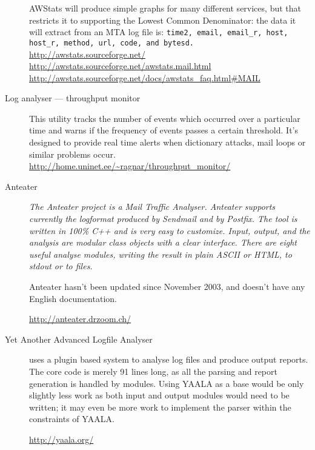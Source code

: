 \documentclass[a4paper,12pt,draft]{article}
\begin{document}
\begin{description}
        AWStats will produce simple graphs for many different services, but
        that restricts it to supporting the Lowest Common Denominator: the
        data it will extract from an MTA log file is:
        \texttt{time2, email, email\_r, host, host\_r, method, url, code,
        and bytesd.} \newline
        \url{http://awstats.sourceforge.net/} \newline
        \url{http://awstats.sourceforge.net/awstats.mail.html} \newline
        \url{http://awstats.sourceforge.net/docs/awstats_faq.html#MAIL}

    \item [Log analyser --- throughput monitor] This utility tracks the
        number of events which occurred over a particular time and warns if
        the frequency of events passes a certain threshold.  It's designed
        to provide real time alerts when dictionary attacks, mail loops or
        similar problems occur.  \newline
        \url{http://home.uninet.ee/~ragnar/throughput_monitor/}

    \item [Anteater] \textit{The Anteater project is a Mail Traffic
        Analyser. Anteater supports currently the logformat produced by
        Sendmail and by Postfix. The tool is written in 100\% C++ and is
        very easy to customize. Input, output, and the analysis are modular
        class objects with a clear interface. There are eight useful
        analyse modules, writing the result in plain ASCII or HTML, to
        stdout or to files.\/}

        Anteater hasn't been updated since November 2003, and doesn't have
        any English documentation.
        
        \url{http://anteater.drzoom.ch/}

    \item [Yet Another Advanced Logfile Analyser] uses a plugin based
        system to analyse log files and produce output reports.  The core
        code is merely 91 lines long, as all the parsing and report
        generation is handled by modules.  Using YAALA as a base would be
        only slightly less work as both input and output modules would need
        to be written; it may even be more work to implement the parser
        within the constraints of YAALA\@.

        \url{http://yaala.org/}


\end{description}
\end{document}
